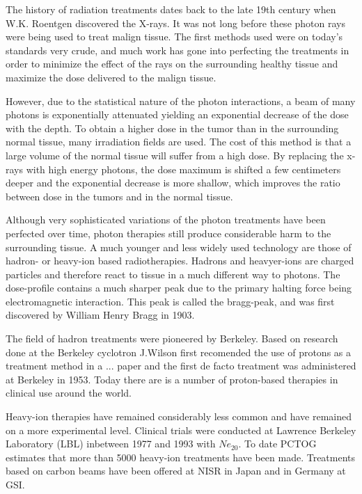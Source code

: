 The history of radiation treatments dates back to the late 19th century when W.K. Roentgen discovered the X-rays. It was not long before these photon rays were being used to treat malign tissue. The first methods used were on today's standards very crude, and much work has gone into perfecting the treatments in order to minimize the effect of the rays on the surrounding healthy tissue and maximize the dose delivered to the malign tissue.

However, due to the statistical nature of the photon interactions, a beam of many photons is
exponentially attenuated yielding an exponential decrease of the dose with the depth. To
obtain a higher dose in the tumor than in the surrounding normal tissue, many irradiation
fields are used. The cost of this method is that a large volume of the normal tissue
will suffer from a high dose. By replacing the x-rays with high energy photons, the dose
maximum is shifted a few centimeters deeper and the exponential decrease is more shallow,
which improves the ratio between dose in the tumors and in the normal tissue.

Although very sophisticated variations of the photon treatments have been perfected over time, photon therapies still produce considerable harm to the surrounding tissue. A much younger and less widely used technology are those of hadron- or heavy-ion based radiotherapies. Hadrons and heavyer-ions are charged particles and therefore react to tissue in a much different way to photons. The dose-profile contains a much sharper peak due to the primary halting force being electromagnetic interaction. This peak is called the bragg-peak, and was first discovered by William Henry Bragg in 1903.

The field of hadron treatments were pioneered by Berkeley. Based on research done at the Berkeley cyclotron J.Wilson first recomended the use of protons as a treatment method in a ... paper and the first de facto treatment was administered at Berkeley in 1953. Today there are is a number of proton-based therapies in clinical use around the world.

Heavy-ion therapies have remained considerably less common and have remained on a more experimental level. Clinical trials were conducted at Lawrence Berkeley Laboratory (LBL) inbetween 1977 and 1993 with $Ne_20$. To date PCTOG estimates that more than 5000 heavy-ion treatments have been made. Treatments based on carbon beams have been offered at NISR in Japan and in Germany at GSI.

